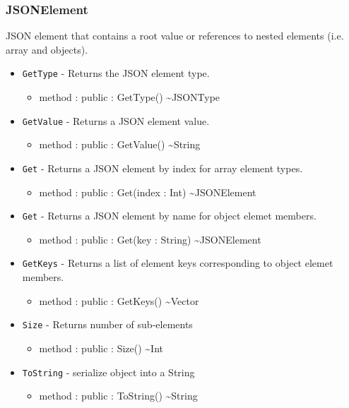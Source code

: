 \documentclass[11pt]{article}
\begin{document}
\subsubsection{JSONElement}
JSON element that contains a root value or references to nested elements (i.e. array and objects). 
\begin{itemize}
  \item \texttt{GetType} - Returns the JSON element type.
    \begin{itemize}
    \item method : public : GetType() \textasciitilde JSONType
    \end{itemize}
  \item \texttt{GetValue} - Returns a JSON element value.
    \begin{itemize}
    \item method : public : GetValue() \textasciitilde String
    \end{itemize}
  \item \texttt{Get} - Returns a JSON element by index for array element types.
    \begin{itemize}
    \item method : public : Get(index : Int) \textasciitilde JSONElement
    \end{itemize}
  \item \texttt{Get} - Returns a JSON element by name for object elemet members.
    \begin{itemize}
    \item method : public : Get(key : String) \textasciitilde JSONElement
    \end{itemize}
  \item \texttt{GetKeys} - Returns a list of element keys corresponding to object elemet members.
    \begin{itemize}
    \item method : public : GetKeys() \textasciitilde Vector
    \end{itemize}
  \item \texttt{Size} - Returns number of sub-elements
    \begin{itemize}
    \item method : public : Size() \textasciitilde Int
    \end{itemize}
  \item \texttt{ToString} - serialize object into a String
    \begin{itemize}
    \item method : public : ToString() \textasciitilde String
    \end{itemize}
\end{itemize}
\end{document}
